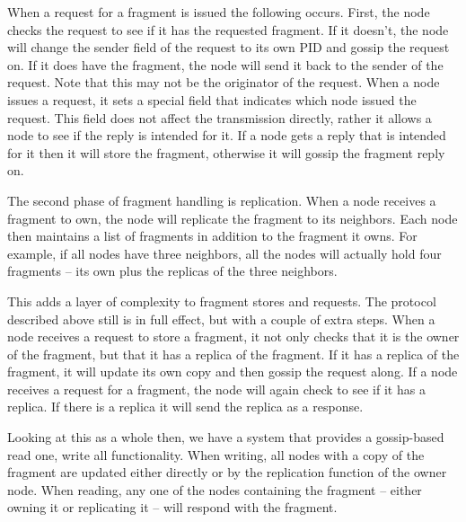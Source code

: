 When a request for a fragment is issued the following occurs. First, the node checks the request to see if it has the requested fragment. If it doesn't, the node will change the sender field of the request to its own PID and gossip the request on. If it does have the fragment, the node will send it back to the sender of the request. Note that this may not be the originator of the request. When a node issues a request, it sets a special field that indicates which node issued the request. This field does not affect the transmission directly, rather it allows a node to see if the reply is intended for it. If a node gets a reply that is intended for it then it will store the fragment, otherwise it will gossip the fragment reply on.

The second phase of fragment handling is replication. When a node receives a fragment to own, the node will replicate the fragment to its neighbors. Each node then maintains a list of fragments in addition to the fragment it owns. For example, if all nodes have three neighbors, all the nodes will actually hold four fragments – its own plus the replicas of the three neighbors.

This adds a layer of complexity to fragment stores and requests. The protocol described above still is in full effect, but with a couple of extra steps. When a node receives a request to store a fragment, it not only checks that it is the owner of the fragment, but that it has a replica of the fragment. If it has a replica of the fragment, it will update its own copy and then gossip the request along. If a node receives a request for a fragment, the node will again check to see if it has a replica. If there is a replica it will send the replica as a response.

Looking at this as a whole then, we have a system that provides a gossip-based read one, write all functionality. When writing, all nodes with a copy of the fragment are updated either directly or by the replication function of the owner node. When reading, any one of the nodes containing the fragment – either owning it or replicating it – will respond with the fragment.

